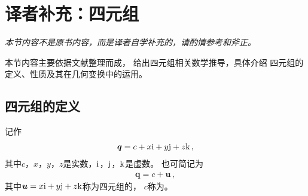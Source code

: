 \section{译者补充：四元组}\label{sec:译者补充：四元组}
\emph{本节内容不是原书内容，而是译者自学补充的，请酌情参考和斧正。}

本节内容主要依据文献\citep{10.5555/90767.90913}整理而成，
给出四元组相关数学推导，具体介绍
四元组的定义、性质及其在几何变换中的运用。

\subsection{四元组的定义}\label{sub:四元组的定义}
\begin{definition}
    记作
    \begin{align}
        {\bm q}=c+x{\rm i}+y{\rm j}+z{\rm k}\, ,
    \end{align}
    其中$c$，$x$，$y$，$z$是实数，${\rm i}$，${\rm j}$，${\rm k}$是虚数。
    也可简记为
    \begin{align}
        {\bm q}=c+{\bm u}\, ,
    \end{align}
    其中${\bm u}=x{\rm i}+y{\rm j}+z{\rm k}$称为四元组的，
    $c$称为。
\end{definition}

